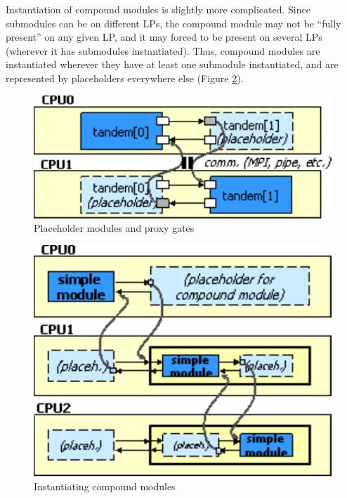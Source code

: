 Instantiation of compound modules is slightly more complicated.
Since submodules can be on different LPs, the compound module may
not be ``fully present'' on any given LP, and it may forced to be
present on several LPs (wherever it has submodules instantiated).
Thus, compound modules are instantiated wherever they have
at least one submodule instantiated, and are represented by placeholders
everywhere else (Figure \ref{fig:inst}).


\begin{figure}[htbp]
  \begin{center}
    \includegraphics{figures/placeholders}
    \caption{Placeholder modules and proxy gates}
    \label{fig:plach}
  \end{center}
\end{figure}

\begin{figure}[htbp]
  \begin{center}
    \includegraphics{figures/placeholders2}
    \caption{Instantiating compound modules}
    \label{fig:inst}
  \end{center}
\end{figure}


